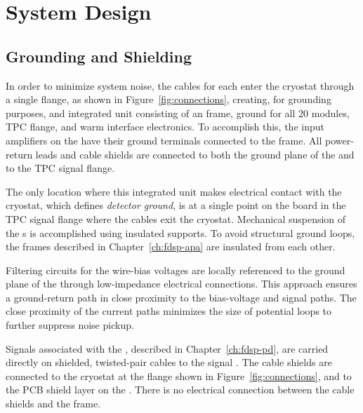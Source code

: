 \section{System Design}
\label{sec:fdsp-tpcelec-design}

\subsection{Grounding and Shielding}
\label{sec:fdsp-tpcelec-design-grounding}


In order to minimize system noise, the  cables for each  enter 
the cryostat through a single  flange, as shown in Figure~\ref{fig:connections}, creating, for grounding purposes, and integrated unit consisting of an  frame,  ground for all \num{20}  modules, TPC flange, and warm interface
electronics. To accomplish this,
the input amplifiers on the   have their ground terminals connected to the  frame. 
All power-return leads and cable shields are connected to both the ground plane of the  and to the TPC signal flange.

The only location where this integrated unit makes electrical contact with the 
cryostat, which defines \textit{detector ground}, is at a single point on the  \fdth board in the TPC signal flange where the 
cables exit the cryostat. Mechanical suspension of the s is accomplished using insulated supports. 
To avoid structural ground loops, the  frames described in Chapter~\ref{ch:fdsp-apa} are 
insulated from each other.

Filtering circuits for the  wire-bias voltages are locally referenced to the ground plane of the  through low-impedance electrical connections. This approach ensures a ground-return path in close proximity to the bias-voltage and signal paths. The close proximity of the current paths minimizes the size of potential loops to further suppress noise pickup.

Signals associated with the , described in Chapter~\ref{ch:fdsp-pd}, are carried directly on shielded, 
twisted-pair cables to the signal \fdth. The cable shields are connected to the cryostat 
at the  flange shown in Figure~\ref{fig:connections}, and to the PCB shield layer on the . There is no electrical connection between the cable shields and the  frame.

